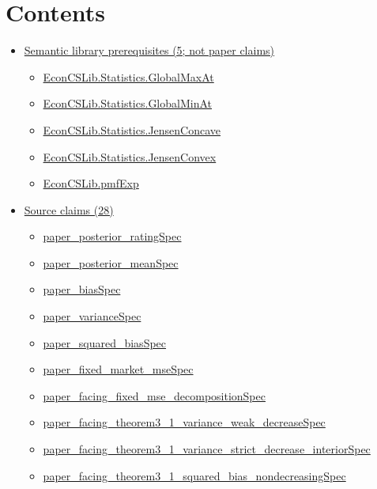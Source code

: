 \documentclass[10pt]{article}
\begin{document}
\section*{Contents}
\begin{itemize}[leftmargin=1.2em]
\item \hyperlink{library-section-ad8f8e32cbdfebc6}{Semantic library prerequisites (5; not paper claims)}
\begin{itemize}[leftmargin=1.2em]
\item \hyperlink{library-prerequisite-035345cdc23fb9d0}{EconCSLib.Statistics.GlobalMaxAt}
\item \hyperlink{library-prerequisite-4257d258b40d00b7}{EconCSLib.Statistics.GlobalMinAt}
\item \hyperlink{library-prerequisite-1661d59161ee9155}{EconCSLib.Statistics.JensenConcave}
\item \hyperlink{library-prerequisite-aa3d377dcc497061}{EconCSLib.Statistics.JensenConvex}
\item \hyperlink{library-prerequisite-e5c7eedc40c11b7a}{EconCSLib.pmfExp}
\end{itemize}
\item \hyperlink{source-section-f10b5f68e4acf3dc}{Source claims (28)}
\begin{itemize}[leftmargin=1.2em]
\item \hyperlink{source-claim-7a45c0b2fffc539f}{paper\_posterior\_ratingSpec}
\item \hyperlink{source-claim-ec7384519273acb4}{paper\_posterior\_meanSpec}
\item \hyperlink{source-claim-20150c21c10be6e2}{paper\_biasSpec}
\item \hyperlink{source-claim-23bc13a84ad0b29a}{paper\_varianceSpec}
\item \hyperlink{source-claim-6e52f3be6106ad49}{paper\_squared\_biasSpec}
\item \hyperlink{source-claim-9fd08233a5aeb857}{paper\_fixed\_market\_mseSpec}
\item \hyperlink{source-claim-da6d1b14c0df1e3e}{paper\_facing\_fixed\_mse\_decompositionSpec}
\item \hyperlink{source-claim-000171f0bf87b98c}{paper\_facing\_theorem3\_1\_variance\_weak\_decreaseSpec}
\item \hyperlink{source-claim-976fc5a9912d46b4}{paper\_facing\_theorem3\_1\_variance\_strict\_decrease\_interiorSpec}
\item \hyperlink{source-claim-5564d9d725c13f20}{paper\_facing\_theorem3\_1\_squared\_bias\_nondecreasingSpec}

\end{itemize}
\end{itemize}
\end{document}
